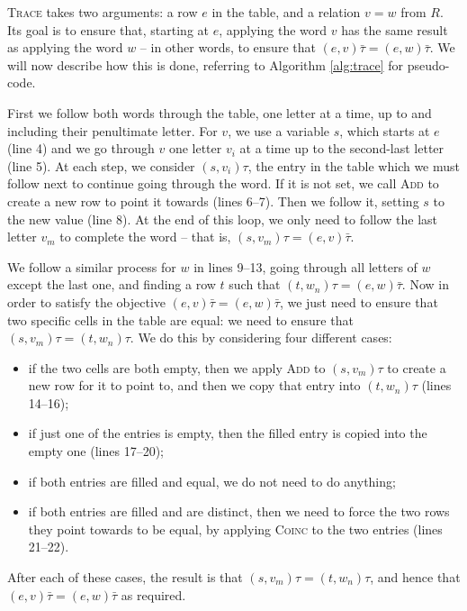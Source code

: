 \textsc{Trace} takes two arguments: a row $e$ in the table, and a relation $v=w$
from $R$.  Its goal is to ensure that, starting at $e$, applying the word $v$
has the same result as applying the word $w$ -- in other words, to ensure that
$(e,v)\bar\tau = (e,w)\bar\tau$.  We will now describe how this is done, referring to
Algorithm \ref{alg:trace} for pseudo-code.

First we follow both words through the table, one letter at a time, up to and
including their penultimate letter.  For $v$, we use a variable $s$, which
starts at $e$ (line 4) and we go through $v$ one letter $v_i$ at a time up to
the second-last letter (line 5).  At each step, we consider $(s, v_i)\tau$, the
entry in the table which we must follow next to continue going through the
word.  If it is not set, we call \textsc{Add} to create a new row to point it
towards (lines 6--7).  Then we follow it, setting $s$ to the new value (line
8).  At the end of this loop, we only need to follow the last letter $v_m$ to
complete the word -- that is, $(s, v_m)\tau = (e, v)\bar\tau$.

We follow a similar process for $w$ in lines 9--13, going through all letters of
$w$ except the last one, and finding a row $t$ such that
$(t, w_n)\tau = (e, w)\bar\tau$.  Now in order to satisfy the objective
$(e,v)\bar\tau = (e,w)\bar\tau$, we just need to ensure that two specific cells
in the table are equal: we need to ensure that $(s, v_m)\tau = (t, w_n)\tau$.
We do this by considering four different cases:
\begin{itemize}
\item if the two cells are both empty, then we apply \textsc{Add} to
  $(s, v_m)\tau$ to create a new row for it to point to, and then we copy that
  entry into $(t, w_n)\tau$ (lines 14--16);
\item if just one of the entries is empty, then the filled entry is copied into
  the empty one (lines 17--20);
\item if both entries are filled and equal, we do not need to do anything;
\item if both entries are filled and are distinct, then we need to force the two
  rows they point towards to be equal, by applying \textsc{Coinc} to the two
  entries (lines 21--22).
\end{itemize}
After each of these cases, the result is that $(s, v_m)\tau = (t, w_n)\tau$, and
hence that $(e, v)\bar\tau = (e, w)\bar\tau$ as required.

